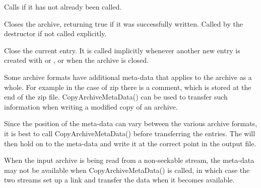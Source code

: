 

\label{wxarchiveoutputstreamdtor}


Calls  if it has not already
been called.


\label{wxarchiveoutputstreamclose}


Closes the archive, returning true if it was successfully written.
Called by the destructor if not called explicitly.


\label{wxarchiveoutputstreamcloseentry}


Close the current entry. It is called implicitly whenever another new
entry is created with 
or , or
when the archive is closed.


\label{wxarchiveoutputstreamcopyarchivemetadata}


Some archive formats have additional meta-data that applies to the archive
as a whole.  For example in the case of zip there is a comment, which
is stored at the end of the zip file.  CopyArchiveMetaData() can be used
to transfer such information when writing a modified copy of an archive.

Since the position of the meta-data can vary between the various archive
formats, it is best to call CopyArchiveMetaData() before transferring
the entries.  The 
will then hold on to the meta-data and write it at the correct point in
the output file.

When the input archive is being read from a non-seekable stream, the
meta-data may not be available when CopyArchiveMetaData() is called,
in which case the two streams set up a link and transfer the data
when it becomes available.


\label{wxarchiveoutputstreamcopyentry}

